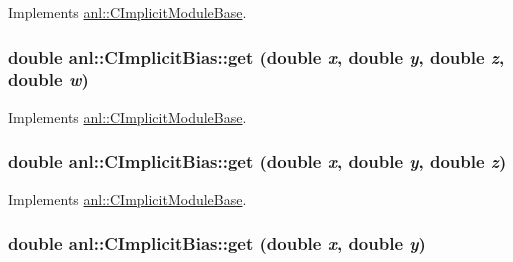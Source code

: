 Implements \hyperlink{classanl_1_1CImplicitModuleBase_aa40b7d54572197612a4fea44b63447eb}{anl::CImplicitModuleBase}.\hypertarget{classanl_1_1CImplicitBias_a9b033816e96601675dd0d9abdd56df4e}{
\subsubsection[{get}]{\setlength{\rightskip}{0pt plus 5cm}double anl::CImplicitBias::get (double {\em x}, \/  double {\em y}, \/  double {\em z}, \/  double {\em w})}}
\label{classanl_1_1CImplicitBias_a9b033816e96601675dd0d9abdd56df4e}


Implements \hyperlink{classanl_1_1CImplicitModuleBase_a3cf520bdab59631864253c03b4e1723f}{anl::CImplicitModuleBase}.\hypertarget{classanl_1_1CImplicitBias_a31ad13c0e8b41f5d8b8df9d93f22501d}{
\subsubsection[{get}]{\setlength{\rightskip}{0pt plus 5cm}double anl::CImplicitBias::get (double {\em x}, \/  double {\em y}, \/  double {\em z})}}
\label{classanl_1_1CImplicitBias_a31ad13c0e8b41f5d8b8df9d93f22501d}


Implements \hyperlink{classanl_1_1CImplicitModuleBase_ac17d592612c82ba3d47f9229a00b1fe3}{anl::CImplicitModuleBase}.\hypertarget{classanl_1_1CImplicitBias_a7bc226cf7d835946936e76144e56a5b6}{
\subsubsection[{get}]{\setlength{\rightskip}{0pt plus 5cm}double anl::CImplicitBias::get (double {\em x}, \/  double {\em y})}}
\label{classanl_1_1CImplicitBias_a7bc226cf7d835946936e76144e56a5b6}


